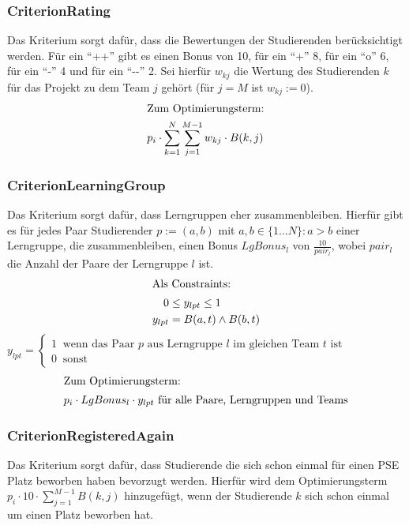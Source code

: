 \documentclass[parskip=full]{scrartcl}
\begin{document}
\subsubsection{CriterionRating}
Das Kriterium sorgt dafür, dass die Bewertungen der Studierenden berücksichtigt
werden. Für ein \enquote{++} gibt es einen Bonus von 10, für ein \enquote{+} 8,
für ein \enquote{o} 6, für ein \enquote{-} 4 und für ein \enquote{-{}-} 2. Sei
hierfür $w_{kj}$ die Wertung des Studierenden $k$ für das Projekt zu dem Team
$j$ gehört (für $j = M$ ist $w_{kj} := 0$).
\begin{align*}
\intertext{Zum Optimierungsterm:}
p_i \cdot \sum_{k=1}^{N}\sum_{j=1}^{M-1}w_{kj} \cdot B(k,j)
\end{align*}

\subsubsection{CriterionLearningGroup}
Das Kriterium sorgt dafür, dass Lerngruppen eher zusammenbleiben. Hierfür gibt es
für jedes Paar Studierender $p:= (a,b)$ mit $a,b \in \{ 1\ldots N\}: a > b$
einer Lerngruppe, die zusammenbleiben, einen Bonus $LgBonus_l$ von $\frac{10}{pair_l}$, wobei $pair_l$ die Anzahl der Paare der
Lerngruppe $l$ ist.
\begin{align*}
\intertext{Als Constraints: }
0 &\le y_{lpt} \le 1  \\
y_{lpt} &= B(a,t) \wedge B(b,t)
\end{align*}
$y_{lpt} =\begin{cases}
1 \;\; \text{wenn das Paar $p$ aus
Lerngruppe $l$ im  gleichen Team $t$ ist} \\
0 \;\;\text{sonst}
\end{cases}$
\begin{align*}
\intertext{Zum Optimierungsterm: } 
p_i \cdot LgBonus_l \cdot y_{lpt} \text{ für alle Paare, Lerngruppen und Teams}
\end{align*} 

\subsubsection{CriterionRegisteredAgain}
Das Kriterium sorgt dafür, dass Studierende die sich schon einmal für einen PSE
Platz beworben haben bevorzugt werden. Hierfür wird dem Optimierungsterm
$p_i \cdot 10 \cdot \sum_{j = 1}^{M-1} B(k,j)$ hinzugefügt, wenn der
Studierende $k$ sich schon einmal um einen Platz beworben hat.
\end{document}

